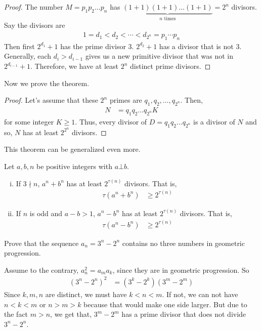 \documentclass{subfile}
\begin{document}
		\begin{proof}
			The number $M=p_1p_2\dots p_n$ has $\underbrace{(1+1)(1+1)\dots(1+1)}_{n\text{ times}}=2^n$ divisors. Say the divisors are
				\begin{align*}
					1=d_1<d_2<\cdots<d_{2^n}=p_1\cdots p_n
				\end{align*}
			Then first $2^{d_1}+1$ has the prime divisor $3$. $2^{d_2}+1$ has a divisor that is not $3$. Generally, each $d_i>d_{i-1}$ gives us a new primitive divisor that was not in $2^{d_{i-1}}+1$. Therefore, we have at least $2^n$ distinct prime divisors.
		\end{proof}
	Now we prove the theorem.
		\begin{proof}
			Let's assume that these $2^n$ primes are $q_1, q_2, \dots, q_{2^n}$. Then,
				\begin{align*}
					N & = q_1q_2\dots q_{2^n}K
				\end{align*}
			for some integer $K\geq1$. Thus, every divisor of $D=q_1q_2\dots q_{2^n}$ is a divisor of $N$ and so, $N$ has at least $2^{2^n}$ divisors.
		\end{proof}
	This theorem can be generalized even more.
		\begin{theorem}
			Let $a,b,n$ be positive integers with $a\bot b$.
				\begin{enumerate}[i.]
					\item If $3\nmid n$, $a^n+b^n$ has at least $2^{\tau(n)}$ divisors. That is,
						\begin{align*}
							\tau(a^n+b^n) &\geq2^{\tau(n)}
						\end{align*}
					\item If $n$ is odd and $a-b>1$, $a^n-b^n$ has at least $2^{\tau(n)}$ divisors. That is,
						\begin{align*}
							\tau(a^n-b^n) & \geq2^{\tau(n)}
						\end{align*}
				\end{enumerate}
		\end{theorem}

		\begin{problem}
			Prove that the sequence $a_n = 3^n - 2^n$ contains no three numbers in geometric progression.
		\end{problem}

		\begin{solution}
			Assume to the contrary, $a_n^2=a_ma_k$, since they are in geometric progression. So
				\begin{align*}
					(3^n-2^n)^2 & = (3^k-2^k)(3^m-2^m)
				\end{align*}
			Since $k,m,n$ are distinct, we must have $k<n<m$. If not, we can not have $n<k<m$ or $n>m>k$ because that would make one side larger. But due to the fact $m>n$, we get that, $3^m-2^m$ has a prime divisor that does not divide $3^n-2^n$.
		\end{solution}
\end{document}
